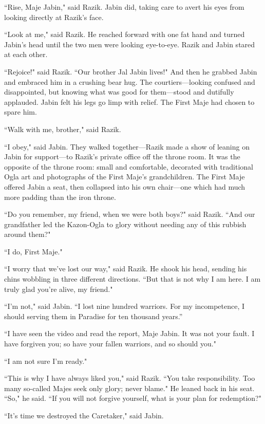 \documentclass[twoside,letterpaper,12pt]{memoir}
\begin{document}
``Rise, Maje Jabin," said Razik. Jabin did, taking care to avert his eyes from looking directly at Razik's face.

``Look at me," said Razik. He reached forward with one fat hand and turned Jabin's head until the two men were looking eye-to-eye. Razik and Jabin stared at each other.

``Rejoice!" said Razik. ``Our brother Jal Jabin lives!" And then he grabbed Jabin and embraced him in a crushing bear hug. The courtiers---looking confused and disappointed, but knowing what was good for them---stood and dutifully applauded. Jabin felt his legs go limp with relief. The First Maje had chosen to spare him.

``Walk with me, brother," said Razik.

``I obey," said Jabin. They walked together---Razik made a show of leaning on Jabin for support---to Razik's private office off the throne room. It was the opposite of the throne room: small and comfortable, decorated with traditional Ogla art and photographs of the First Maje's grandchildren. The First Maje offered Jabin a seat, then collapsed into his own chair---one which had much more padding than the iron throne.

``Do you remember, my friend, when we were both boys?" said Razik. ``And our grandfather led the Kazon-Ogla to glory without needing any of this rubbish around them?"

``I do, First Maje."

``I worry that we've lost our way," said Razik. He shook his head, sending his chins wobbling in three different directions. ``But that is not why I am here. I am truly glad you're alive, my friend."

``I'm not," said Jabin. ``I lost nine hundred warriors. For my incompetence, I should serving them in Paradise for ten thousand years.''

``I have seen the video and read the report, Maje Jabin. It was not your fault. I have forgiven you; so have your fallen warriors, and so should you."

``I am not sure I'm ready."

``This is why I have always liked you," said Razik. ``You take responsibility. Too many so-called Majes seek only glory; never blame." He leaned back in his seat. ``So," he said. ``If you will not forgive yourself, what is your plan for redemption?"

``It's time we destroyed the Caretaker," said Jabin.
\end{document}
